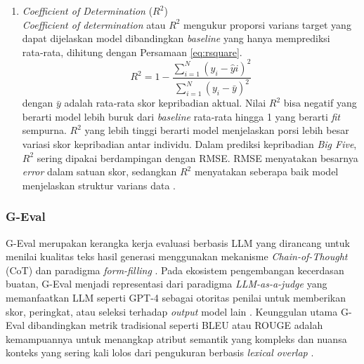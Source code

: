 \begin{enumerate}[nosep, label=\alph*.]
	\item \textit{Coefficient of Determination} ($R^{2}$)  \\
	\textit{Coefficient of determination} atau $R^{2}$ mengukur proporsi varians target yang dapat dijelaskan model dibandingkan \textit{baseline} yang hanya memprediksi rata‑rata, dihitung dengan Persamaan \ref{eq:rsquare}.
	\begin{equation}
		R^{2} = 1 - \frac{\sum_{i=1}^{N} (y_i - \hat{y}i)^2}{\sum_{i=1}^{N} (y_i - \bar{y})^2}
		\label{eq:rsquare}
	\end{equation}
	dengan $\bar{y}$ adalah rata‑rata skor kepribadian aktual. Nilai $R^{2}$ bisa negatif yang berarti model lebih buruk dari \textit{baseline} rata‑rata hingga 1 yang berarti \textit{fit} sempurna. $R^{2}$ yang lebih tinggi berarti model menjelaskan porsi lebih besar variasi skor kepribadian antar individu. Dalam prediksi kepribadian \textit{Big Five}, $R^{2}$ sering dipakai berdampingan dengan RMSE. RMSE menyatakan besarnya \textit{error} dalam satuan skor, sedangkan $R^{2}$ menyatakan seberapa baik model menjelaskan struktur varians data \parencite{Chicco2021, Habib2024}.
\end{enumerate}

\subsubsection{G-Eval}

G-Eval merupakan kerangka kerja evaluasi berbasis LLM yang dirancang untuk menilai kualitas teks hasil generasi menggunakan mekanisme \textit{Chain-of-Thought} (CoT) dan paradigma \textit{form-filling} \parencite{Liu2023}. Pada ekosistem pengembangan kecerdasan buatan, G-Eval menjadi representasi dari paradigma \textit{LLM-as-a-judge} yang memanfaatkan LLM seperti GPT-4 sebagai otoritas penilai untuk memberikan skor, peringkat, atau seleksi terhadap \textit{output} model lain \parencite{Li2025}. Keunggulan utama G-Eval dibandingkan metrik tradisional seperti BLEU atau ROUGE adalah kemampuannya untuk menangkap atribut semantik yang kompleks dan nuansa konteks yang sering kali lolos dari pengukuran berbasis \textit{lexical overlap} \parencite{Pereira2024}.

